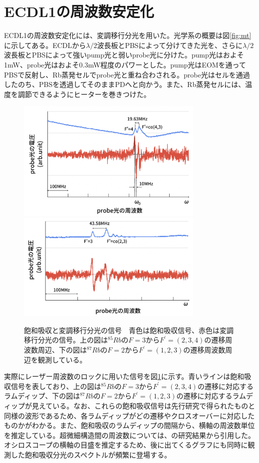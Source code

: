 \documentclass[dvipdfmx]{jsreport}
\begin{document}
\section{ECDL1の周波数安定化}
ECDL1の周波数安定化には、変調移行分光を用いた。光学系の概要は図\ref{fig:mt}に示してある。ECDLから$\lambda / 2$波長板とPBSによって分けてきた光を、さらに$\lambda / 2$波長板とPBSによって強いpump光と弱いprobe光に分けた。pump光はおよそ1mW、probe光はおよそ0.3mW程度のパワーとした。pump光はEOMを通ってPBSで反射し、Rb蒸発セルでprobe光と重ね合わされる。probe光はセルを通過したのち、PBSを透過してそのままPDへと向かう。また、Rb蒸発セルには、温度を調節できるようにヒーターを巻きつけた。
\begin{figure}
\centering
\includegraphics[width=0.8\textwidth]{images/mt85_graph.png}
\includegraphics[width=0.8\textwidth]{images/mt87_graph.png}
\caption{\label{fig:mt-graph}飽和吸収と変調移行分光の信号　青色は飽和吸収信号、赤色は変調移行分光の信号。上の図は$^{85}Rb$の$F=3$から$F^{'}=(2,3,4)$の遷移周波数周辺、下の図は$^{87}Rb$の$F=2$から$F^{'}=(1,2,3)$の遷移周波数周辺を観測している。}
\end{figure}
実際にレーザー周波数のロックに用いた信号を図\ref{fig:mt-graph}に示す。青いラインは飽和吸収信号を表しており、上の図は$^{85}Rb$の$F=3$から$F^{'}=(2,3,4)$の遷移に対応するラムディップ、下の図は$^{87}Rb$の$F=2$から$F^{'}=(1,2,3)$の遷移に対応するラムディップが見えている。なお、これらの飽和吸収信号は先行研究\cite{takase-y}\cite{1.6}で得られたものと同様の波形であるため、各ラムディップがどの遷移やクロスオーバーに対応したものかがわかる。また、飽和吸収のラムディップの間隔から、横軸の周波数単位を推定している。超微細構造間の周波数については、\cite{hyperfine}の研究結果から引用した。オシロスコープの横軸の目盛を推定するため、後に出てくるグラフにも同時に観測した飽和吸収分光のスペクトルが頻繁に登場する。
\end{document}
